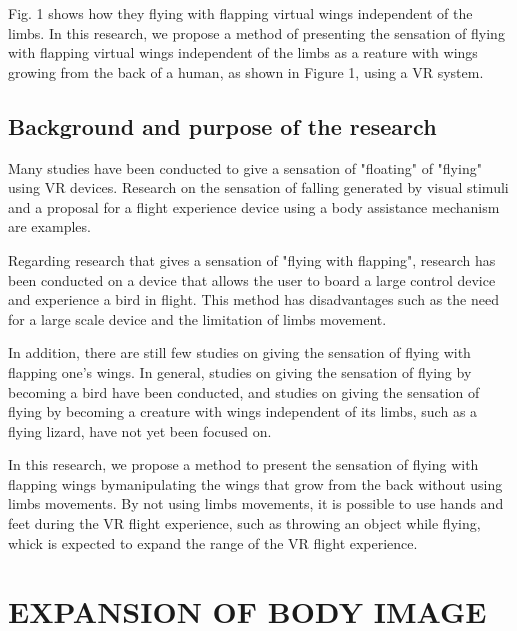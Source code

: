 \documentclass[letterpaper, 10 pt, conference]{ieeeconf}  %
\begin{document}
        Fig. 1 shows how they flying  with flapping virtual wings independent of the limbs.  
        In this research, we propose a method of presenting the sensation of flying with flapping virtual wings independent of the limbs as a reature with wings growing from the back of a human, as shown in Figure 1, using a VR system.  

        \subsection{Background and purpose of the research}
                
                Many studies have been conducted to give a sensation of "floating" of "flying" using VR devices.  
                Research on the sensation of falling generated by visual stimuli
                and a proposal for a flight experience device using a body assistance mechanism
                are examples.  

                Regarding research that gives a sensation of "flying with flapping", research has been conducted on a device that allows the user to board a large control device and experience a bird in flight\cite{rheiner2014birdly}.
                This method has  disadvantages such as the need for a large scale device and the limitation of limbs movement.  

                In addition, there are still few studies on giving the sensation of flying with flapping one's wings.  
                In general, studies on giving the sensation of flying by becoming a bird have been conducted, and studies on giving the sensation of flying by becoming a creature with wings independent of its limbs, such as a flying lizard, have not yet been focused on.

                In this research, we propose a method to present the sensation of flying with flapping wings bymanipulating the wings that grow from the back without using limbs movements.
                By not using limbs movements, it is possible to use hands and feet during the VR flight experience, such as throwing an object while flying, whick is expected to expand the range of the VR flight experience.

\section{EXPANSION OF BODY IMAGE}
\end{document}
